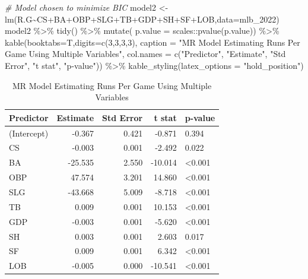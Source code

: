 \documentclass[
  11pt,
]{book}
\newenvironment{Shaded}{\begin{snugshade}}{\end{snugshade}}
\newcommand{\AttributeTok}[1]{\textcolor[rgb]{0.77,0.63,0.00}{#1}}
\newcommand{\CommentTok}[1]{\textcolor[rgb]{0.56,0.35,0.01}{\textit{#1}}}
\newcommand{\DecValTok}[1]{\textcolor[rgb]{0.00,0.00,0.81}{#1}}
\newcommand{\FunctionTok}[1]{\textcolor[rgb]{0.00,0.00,0.00}{#1}}
\newcommand{\NormalTok}[1]{#1}
\newcommand{\OtherTok}[1]{\textcolor[rgb]{0.56,0.35,0.01}{#1}}
\newcommand{\SpecialCharTok}[1]{\textcolor[rgb]{0.00,0.00,0.00}{#1}}
\newcommand{\StringTok}[1]{\textcolor[rgb]{0.31,0.60,0.02}{#1}}
\theoremstyle{definition}
\theoremstyle{definition}
\theoremstyle{definition}
\theoremstyle{definition}
\theoremstyle{remark}
\begin{document}
\newpage

\begin{Shaded}
\begin{Highlighting}[]
\CommentTok{\# Model chosen to minimize BIC}
\NormalTok{model2 }\OtherTok{\textless{}{-}} \FunctionTok{lm}\NormalTok{(R.G}\SpecialCharTok{\textasciitilde{}}\NormalTok{CS}\SpecialCharTok{+}\NormalTok{BA}\SpecialCharTok{+}\NormalTok{OBP}\SpecialCharTok{+}\NormalTok{SLG}\SpecialCharTok{+}\NormalTok{TB}\SpecialCharTok{+}\NormalTok{GDP}\SpecialCharTok{+}\NormalTok{SH}\SpecialCharTok{+}\NormalTok{SF}\SpecialCharTok{+}\NormalTok{LOB,}\AttributeTok{data=}\NormalTok{mlb\_2022)}
\NormalTok{model2 }\SpecialCharTok{\%\textgreater{}\%} \FunctionTok{tidy}\NormalTok{() }\SpecialCharTok{\%\textgreater{}\%}
  \FunctionTok{mutate}\NormalTok{(}
    \AttributeTok{p.value =}\NormalTok{ scales}\SpecialCharTok{::}\FunctionTok{pvalue}\NormalTok{(p.value)) }\SpecialCharTok{\%\textgreater{}\%}
  \FunctionTok{kable}\NormalTok{(}\AttributeTok{booktabs=}\NormalTok{T,}\AttributeTok{digits=}\FunctionTok{c}\NormalTok{(}\DecValTok{3}\NormalTok{,}\DecValTok{3}\NormalTok{,}\DecValTok{3}\NormalTok{,}\DecValTok{3}\NormalTok{), }
        \AttributeTok{caption =} \StringTok{"MR Model Estimating Runs Per Game Using Multiple Variables"}\NormalTok{,}
        \AttributeTok{col.names =} \FunctionTok{c}\NormalTok{(}\StringTok{"Predictor"}\NormalTok{, }\StringTok{"Estimate"}\NormalTok{, }\StringTok{"Std Error"}\NormalTok{, }\StringTok{"t stat"}\NormalTok{, }\StringTok{"p{-}value"}\NormalTok{)) }\SpecialCharTok{\%\textgreater{}\%}
  \FunctionTok{kable\_styling}\NormalTok{(}\AttributeTok{latex\_options =} \StringTok{"hold\_position"}\NormalTok{)}
\end{Highlighting}
\end{Shaded}

\begin{table}[!h]

\caption{\label{tab:unnamed-chunk-224}MR Model Estimating Runs Per Game Using Multiple Variables}
\centering
\begin{tabular}[t]{lrrrl}
\toprule
Predictor & Estimate & Std Error & t stat & p-value\\
\midrule
(Intercept) & -0.367 & 0.421 & -0.871 & 0.394\\
CS & -0.003 & 0.001 & -2.492 & 0.022\\
BA & -25.535 & 2.550 & -10.014 & <0.001\\
OBP & 47.574 & 3.201 & 14.860 & <0.001\\
SLG & -43.668 & 5.009 & -8.718 & <0.001\\
\addlinespace
TB & 0.009 & 0.001 & 10.153 & <0.001\\
GDP & -0.003 & 0.001 & -5.620 & <0.001\\
SH & 0.003 & 0.001 & 2.603 & 0.017\\
SF & 0.009 & 0.001 & 6.342 & <0.001\\
LOB & -0.005 & 0.000 & -10.541 & <0.001\\
\bottomrule
\end{tabular}
\end{table}
\newpage
\end{document}
